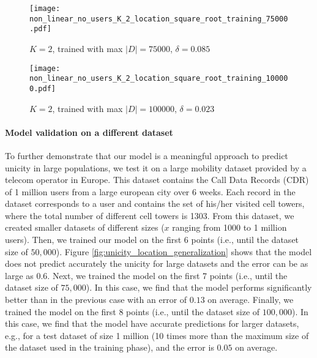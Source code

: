 \documentclass{acm_proc_article-sp}
\theoremstyle{plain}
\theoremstyle{plain}
\theoremstyle{plain}
\theoremstyle{plain}
\theoremstyle{plain}
\theoremstyle{plain}
\begin{document}
\begin{figure*}[!t]
\begin{subfigure}[]{0.3\textwidth}
                \label{fig:K_2_loc_50000}
        \end{subfigure}
    \begin{subfigure}[]{0.3\textwidth}
                \texttt{[image: non\_linear\_no\_users\_K\_2\_location\_square\_root\_training\_75000.pdf]}
                \caption{$K=2$, trained with max $|D|=75000$, $\delta = 0.085$}
                \label{fig:K_2_loc_75000}
        \end{subfigure}
    \begin{subfigure}[]{0.3\textwidth}
                \texttt{[image: non\_linear\_no\_users\_K\_2\_location\_square\_root\_training\_100000.pdf]}
                \caption{$K=2$, trained with max $|D|=100000$, $\delta = 0.023$}
                \label{fig:K_2_loc_100000}
        \end{subfigure}
        \caption{Unicity generalization for different values of $K$ for location data, trained with datasets of different sizes. The learnt models (i.e., $f(x)$) are present in the legend. $x$-axis corresponds to normalized dataset sizes with a normalization factor of $1/10^6$, and $y$-axis shows sample unicity.}\label{fig:unicity_location_generalization}
\end{figure*}


\paragraph{Model validation on a different dataset}
To further demonstrate that our model is a meaningful approach to predict unicity in large populations, we test it on a large mobility dataset provided by a telecom operator in Europe.
This dataset contains the Call Data Records (CDR) of 1 million users from a large european city over 6 weeks. 
Each record in the dataset corresponds to a user and contains the set of his/her visited cell towers, where the total number of different cell towers is 1303. 
From this dataset, we created smaller datasets of different sizes ($x$ ranging from 1000 to 1 million users).
Then, we trained our model on the first 6 points (i.e., until the dataset size of $50,000$).  
Figure \ref{fig:unicity_location_generalization} shows that the model does not predict accurately the unicity for large datasets and the error can be as large as 0.6.
Next, we trained the model on the first 7 points (i.e., until the dataset size of $75,000$).
In this case, we find that the model performs significantly better than in the previous case with an error of $0.13$ on average.
Finally, we trained the model on the first 8 points (i.e., until the dataset size of $100,000$). 
In this case, we find that the model have accurate predictions for larger datasets, e.g., for a test dataset of size 1 million (10 times more than the maximum size of the dataset used in the training phase), and the error is $0.05$ on average.
\end{document}

